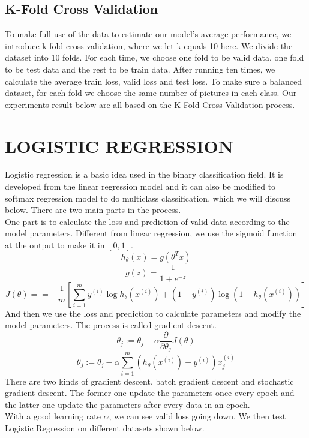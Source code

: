 \documentclass{article} %
\begin{document}
\subsection {K-Fold Cross Validation}
To make full use of the data to estimate our model’s average performance, we introduce k-fold cross-validation, where we let k equals 10 here. We divide the dataset into 10 folds. For each time, we choose one fold to be valid data, one fold to be test data and the rest to be train data. After running ten times, we calculate the average train loss, valid loss and test loss. To make sure a balanced dataset, for each fold we choose the same number of pictures in each class. Our experiments result below are all based on the K-Fold Cross Validation process. 

\section{LOGISTIC REGRESSION}
Logistic regression is a basic idea used in the binary classification field. It is developed from the linear regression model and it can also be modified to softmax regression model to do multiclass classification, which we will discuss below. There are two main parts in the process. \\
One part is to calculate the loss and prediction of valid data according to the model parameters. Different from linear regression, we use the sigmoid function at the output to make it in $[0,1]$. 
$$h_{\theta}(x)=g\left(\theta^{T} x\right)$$
$$g(z)=\frac{1}{1+e^{-z}}$$
$$ J(\theta) = =-\frac{1}{m}\left[\sum_{i=1}^{m} y^{(i)} \log h_{\theta}\left(x^{(i)}\right)+\left(1-y^{(i)}\right) \log \left(1-h_{\theta}\left(x^{(i)}\right)\right)\right]$$
And then we use the loss and prediction to calculate parameters and modify the model parameters. The process is called gradient descent.
$$\theta_{j}:=\theta_{j}-\alpha \frac{\partial}{\partial \theta_{j}} J(\theta)$$
$$\theta_{j}:=\theta_{j}-\alpha \sum_{i=1}^{m}\left(h_{\theta}\left(x^{(i)}\right)-y^{(i)}\right) x_{j}^{(i)}$$
There are two kinds of gradient descent, batch gradient descent and stochastic gradient descent. The former one update the parameters once every epoch and the latter one update the parameters after every data in an epoch.\\
With a good learning rate $\alpha$, we can see valid loss going down. We then test Logistic Regression on different datasets shown below.
\end{document}
